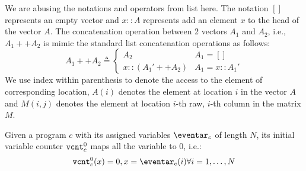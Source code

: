 %
We are abusing the notations and operators from list here. 
The notation $[]$ represents an empty vector
and $x::A$ represents add an element $x$ to the head of the vector $A$.
The concatenation operation between 2 vectors $A_1$ and $A_2$, i.e., $A_1 ++ A_2$ is mimic the standard list concatenation operations as follows:
%
\begin{equation}
    A_1 ++ A_2  
    \triangleq \left\{
    \begin{array}{ll} 
      A_2         & A_1 = []\\
      x::(A_1' ++ A_2)  & A_1 = x::A_1'
    \end{array}
    \right.
\end{equation}
%
We use index within parenthesis to denote the access to the element of corresponding location,
$A(i)$ denotes the element at location $i$ in the vector $A$ and 
$M(i, j)$ denotes the element at location $i$-th raw, $i$-th column in the matrix $M$. 
%
%
%
\begin{defn}
Given a program $c$ with its assigned variables $\eventar_{c}$ of length $N$, its initial variable counter $\mathtt{vcnt}^0_{c}$ maps all the variable to $0$, i.e.:
\[
  \vcounter^0_{c}(x) = 0, x = \eventar_{c}(i) \forall i = 1, \ldots, N 
\]
\end{defn}
%
%
